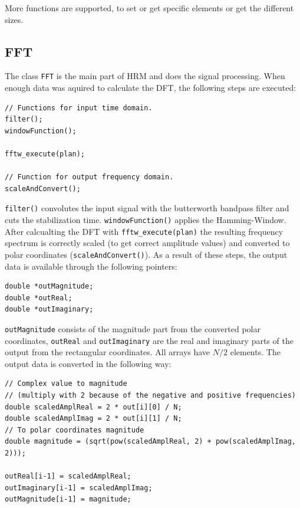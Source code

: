 \documentclass[notitlepage]{scrreprt}
\begin{document}
More functions are supported, to set or get specific elements or get the different sizes.

\subsection{FFT}
The class \lstinline$FFT$ is the main part of HRM and does the signal processing. When enough data was aquired to calculate the DFT, the following steps are executed:

\begin{lstlisting}[caption=FFT.c]
// Functions for input time domain.
filter();
windowFunction();

fftw_execute(plan);

// Function for output frequency domain.
scaleAndConvert();
\end{lstlisting}

\lstinline$filter()$ convolutes the input signal with the butterworth bandpass filter and cuts the stabilization time. \lstinline$windowFunction()$ applies the Hamming-Window. After calcualting the DFT with \lstinline$fftw_execute(plan)$ the resulting frequency spectrum is correctly scaled (to get correct amplitude values) and converted to polar coordinates (\lstinline$scaleAndConvert()$). As a result of these steps, the output data is available through the following pointers:

\begin{lstlisting}[caption=FFT.c]
double *outMagnitude;
double *outReal;
double *outImaginary;
\end{lstlisting}

\lstinline{outMagnitude} consists of the magnitude part from the converted polar coordinates, \lstinline{outReal} and \lstinline{outImaginary} are the real and imaginary parts of the output from the rectangular coordinates. All arrays have $N/2$ elements. The output data is converted in the following way:

\begin{lstlisting}[caption=FFT.c]
// Complex value to magnitude
// (multiply with 2 because of the negative and positive frequencies)
double scaledAmplReal = 2 * out[i][0] / N;
double scaledAmplImag = 2 * out[i][1] / N;
// To polar coordinates magnitude
double magnitude = (sqrt(pow(scaledAmplReal, 2) + pow(scaledAmplImag, 2)));

outReal[i-1] = scaledAmplReal;
outImaginary[i-1] = scaledAmplImag;
outMagnitude[i-1] = magnitude;
\end{lstlisting}
\end{document}
